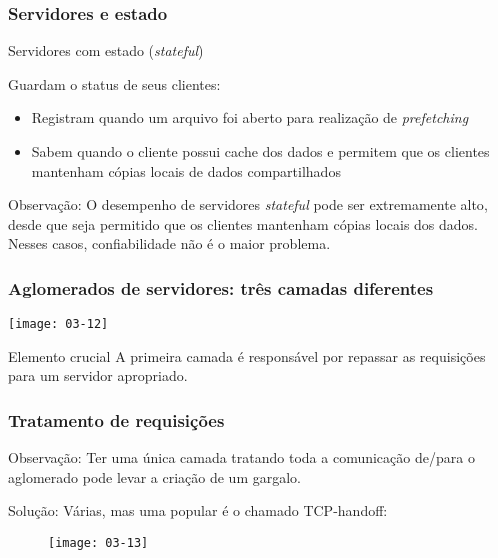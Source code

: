 \documentclass[Ligatures=TeX,table,brazil,svgnames,usetotalslideindicator,compress,10pt]{beamer}
\begin{document}
\begin{frame}
  \frametitle{Servidores e estado}
  \begin{block}{Servidores com estado (\textit{stateful})}

    Guardam o status de seus clientes:
    \begin{itemize}
    \item Registram quando um arquivo foi aberto para realização de \textit{prefetching}
    \item Sabem quando o cliente possui cache dos dados e permitem que os clientes mantenham cópias locais de dados compartilhados
    \end{itemize}
  \end{block}

  \pause
  \begin{alertblock}{Observação:}
    \alert{O desempenho de servidores \textit{stateful} pode ser extremamente alto}, desde que seja permitido que os clientes mantenham cópias locais dos dados. Nesses casos, \alert{confiabilidade não é o maior problema}.
  \end{alertblock}

\end{frame}

\begin{frame}
  \frametitle{Aglomerados de servidores: três camadas diferentes}
  \texttt{[image: 03-12]}

  \begin{block}{Elemento crucial}
    A primeira camada é responsável por repassar as requisições para um servidor apropriado.
  \end{block}
\end{frame}

\begin{frame}
  \frametitle{Tratamento de requisições}
  \begin{block}{Observação:}
    Ter uma única camada tratando toda a comunicação de/para o aglomerado pode levar a criação de um \alert{gargalo}.
  \end{block}

  \begin{exampleblock}{Solução:}
    Várias, mas uma popular é o chamado \alert{TCP-handoff}:
  \end{exampleblock}

  \begin{figure}
    \centering
    \texttt{[image: 03-13]}
  \end{figure}

\end{frame}
\end{document}
